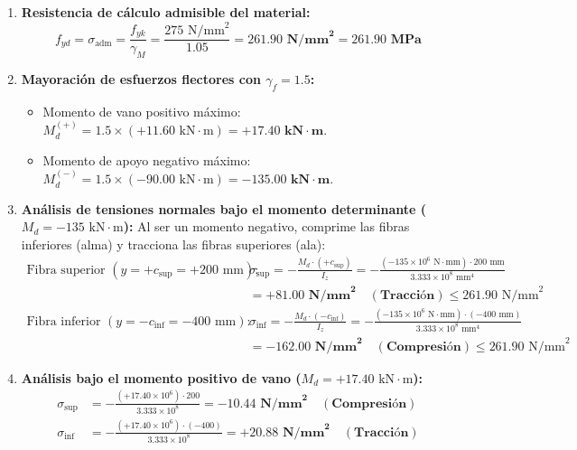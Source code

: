 {    \begin{enumerate}
        \item \textbf{Resistencia de cálculo admisible del material:}
              \begin{equation}
                  f_{yd} = \sigma_{\text{adm}} = \frac{f_{yk}}{\gamma_M} = \frac{275\text{ N/mm}^2}{1.05} = \mathbf{261.90\text{ N/mm}^2 = 261.90\text{ MPa}}
              \end{equation}
        \item \textbf{Mayoración de esfuerzos flectores con $\gamma_f = 1.5$:}
              \begin{itemize}
                  \item Momento de vano positivo máximo: $M_{d}^{(+)} = 1.5 \times (+11.60\text{ kN}\cdot\text{m}) = \mathbf{+17.40\text{ kN}\cdot\text{m}}$.
                  \item Momento de apoyo negativo máximo: $M_{d}^{(-)} = 1.5 \times (-90.00\text{ kN}\cdot\text{m}) = \mathbf{-135.00\text{ kN}\cdot\text{m}}$.
              \end{itemize}
        \item \textbf{Análisis de tensiones normales bajo el momento determinante ($M_{d} = -135\text{ kN}\cdot\text{m}$):}
              Al ser un momento negativo, comprime las fibras inferiores (alma) y tracciona las fibras superiores (ala):
              \begin{align}
                  \text{Fibra superior } (y = +c_{\text{sup}} = +200\text{ mm}): \quad & \sigma_{\text{sup}} = -\frac{M_d \cdot (+c_{\text{sup}})}{I_z} = -\frac{(-135 \times 10^6\text{ N}\cdot\text{mm}) \cdot 200\text{ mm}}{3.333 \times 10^8\text{ mm}^4} \nonumber \\
                                                                                       & = \mathbf{+81.00\text{ N/mm}^2 \quad (\text{Tracción})} \le 261.90\text{ N/mm}^2                                                                                          \\
                  \text{Fibra inferior } (y = -c_{\text{inf}} = -400\text{ mm}): \quad & \sigma_{\text{inf}} = -\frac{M_d \cdot (-c_{\text{inf}})}{I_z} = -\frac{(-135 \times 10^6\text{ N}\cdot\text{mm}) \cdot (-400\text{ mm})}{3.333 \times 10^8\text{ mm}^4} \nonumber \\
                                                                                       & = \mathbf{-162.00\text{ N/mm}^2 \quad (\text{Compresión})} \le 261.90\text{ N/mm}^2
              \end{align}
        \item \textbf{Análisis bajo el momento positivo de vano ($M_d = +17.40\text{ kN}\cdot\text{m}$):}
              \begin{align}
                  \sigma_{\text{sup}} & = -\frac{(+17.40 \times 10^6) \cdot 200}{3.333 \times 10^8} = \mathbf{-10.44\text{ N/mm}^2 \quad (\text{Compresión})} \\
                  \sigma_{\text{inf}} & = -\frac{(+17.40 \times 10^6) \cdot (-400)}{3.333 \times 10^8} = \mathbf{+20.88\text{ N/mm}^2 \quad (\text{Tracción})}
              \end{align}
    \end{enumerate}

}
